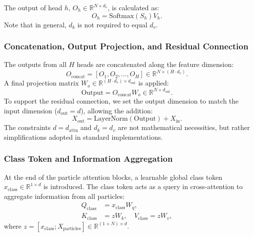 \documentclass[12pt]{article}
\begin{document}
            The output of head $h$, $O_h \in \mathbb{R}^{N \times d_v}$, is calculated as:
            \begin{equation}
                O_h = \text{Softmax}(S_h) V_h.
            \end{equation}
            Note that in general, $d_k$ is not required to equal $d_v$. 

        \subsubsection{Concatenation, Output Projection, and Residual Connection}

            The outputs from all $H$ heads are concatenated along the feature dimension:
            \begin{equation}
                O_{\text{concat}} = \left[ O_1, O_2, \dots, O_H \right] \in \mathbb{R}^{N \times (H \cdot d_v)}.
            \end{equation}
            A final projection matrix $W_o \in \mathbb{R}^{(H \cdot d_v) \times d_{\text{out}}}$ is applied:
            \begin{equation}
                \text{Output} = O_{\text{concat}} W_o \in \mathbb{R}^{N \times d_{\text{out}}}.
            \end{equation}
            To support the residual connection, we set the output dimension to match the input dimension ($d_{\text{out}} = d$), allowing the addition:
            \begin{equation}
                X_{\text{out}} = \text{LayerNorm}\left( \text{Output} \right) + X_{\text{in}}.
            \end{equation}
            The constraints $d = d_{\text{attn}}$ and $d_k = d_v$ are not mathematical necessities, but rather simplifications adopted in standard implementations.

        \subsubsection{Class Token and Information Aggregation}
        \label{sub:class_token_info}

            At the end of the particle attention blocks, a learnable global class token $x_{\text{class}} \in \mathbb{R}^{1 \times d}$ is introduced. The class token acts as a query in cross-attention to aggregate information from all particles:
            \begin{align}
                \label{eq:class_token_qkv}
                Q_{\text{class}} &= x_{\text{class}} W_q, \\
                K_{\text{class}} &= z W_k, \quad V_{\text{class}} = z W_v,
            \end{align}
            where $z = [x_{\text{class}}; X_{\text{particles}}] \in \mathbb{R}^{(1+N) \times d}$. 
            
\end{document}
